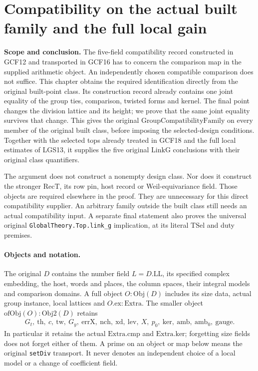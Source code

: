\section{Compatibility on the actual built family and the full local gain}
\label{sec:witness-realization-v049}

\noindent\textbf{Scope and conclusion.}
The five-field compatibility record constructed in GCF12 and transported
in GCF16 has to concern the comparison map in the supplied arithmetic
object.  An independently chosen compatible comparison does not suffice.
This chapter obtains the required identification directly from the
original built-point class.  Its construction record already contains
one joint equality of the group ties, comparison, twisted forms and
kernel.  The final point changes the division lattice and its height;
we prove that the same joint equality survives that change.  This gives
the original \(\mathrm{GroupCompatibilityFamily}\) on every member of
the original built class, before imposing the selected-design conditions.
Together with the selected tops already treated in GCF18 and the full
local estimates of LGS13, it supplies the five original
\(\mathrm{LinkG}\) conclusions with their original class quantifiers.

The argument does not construct a nonempty design class.  Nor does it
construct the stronger \(\mathrm{RecT}\), its row pin, host record or
Weil-equivariance field.  Those objects are required elsewhere in the
proof.  They are unnecessary for this direct compatibility supplier.
An arbitrary family outside the built class still needs an actual
compatibility input.  A separate final statement also proves the
universal original \texttt{GlobalTheory.Top.link\_g} implication, at its
literal \(\mathrm{TSel}\) and duty premises.

\paragraph{Objects and notation.}
The original \(D\) contains the number field \(L=D.\mathrm{LL}\), its
specified complex embedding, the host, words and places, the column
spaces, their integral models and comparison domains.  A full object
\(O:\mathrm{Obj}(D)\) includes its size data, actual group instance,
local lattices and \(O.\mathrm{ex}:\mathrm{Extra}\).
The smaller object \(\mathrm{ofObj}(O):\mathrm{Obj2}(D)\) retains
\[
 \begin{gathered}
 G_t,\ \mathrm{th},\ c,\ \mathrm{tw},\ G_y,\
 \mathrm{errX},\ \mathrm{nch},\ \mathrm{xd},\ \mathrm{lev},\
 X,\ p_0,\ \mathrm{ker},\ \mathrm{amb},\ \mathrm{amb}_0,\
 \mathrm{gauge}.
 \end{gathered}
\]
In particular it retains the actual \(\mathrm{Extra}.\mathrm{cmp}\)
and \(\mathrm{Extra}.\mathrm{ker}\); forgetting size fields does not
forget either of them.  A prime on an object or map below means the
original \texttt{setDiv} transport.  It never denotes an independent
choice of a local model or a change of coefficient field.

